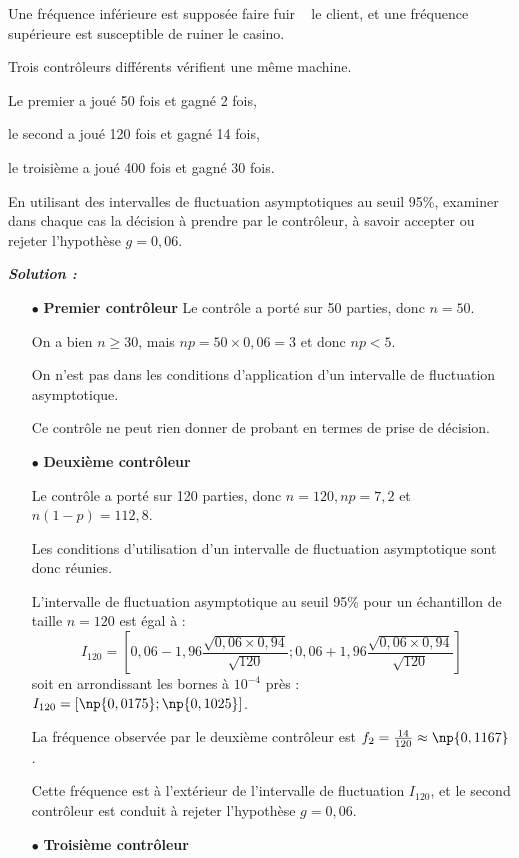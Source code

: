 \documentclass[12pt,french]{book}
\begin{document}
\begin{spacing}{1.2}
\begin{defi}
Une fréquence inférieure est supposée faire \og fuir \fg~ le client, et une fréquence supérieure est susceptible de ruiner le casino.

Trois contrôleurs différents vérifient une même machine.

Le premier a joué 50 fois et gagné 2 fois,

le second a joué 120 fois et gagné 14 fois,

le troisième a joué 400 fois et gagné 30 fois.

En utilisant des intervalles de fluctuation asymptotiques au seuil 95\%, examiner dans chaque cas la décision à prendre par le contrôleur, à savoir accepter ou rejeter l'hypothèse $g=0,06$.
\end{defi}

\bigskip

\textbf{\textit{Solution :}}

\begin{itemize}
\item[$\bullet$] \textbf{Premier contrôleur}
Le contrôle a porté sur 50 parties, donc $n=50$.

On a bien $n\geq 30$, mais $np=50\times 0,06=3$ et donc $np<5$.

On n'est pas dans les conditions d'application d'un intervalle de fluctuation asymptotique.

Ce contrôle ne peut rien donner de probant en termes de prise de décision.

\item[$\bullet$] \textbf{Deuxième contrôleur}

Le contrôle a porté sur 120 parties, donc $n=120, np=7,2$ et $n(1-p)=112,8$.

Les conditions d'utilisation d'un intervalle de fluctuation asymptotique sont donc réunies.

L'intervalle de fluctuation asymptotique au seuil 95\% pour un échantillon de taille $n=120$ est égal à :
\[I_{120}=\left[0,06-1,96\frac{\sqrt{0,06\times 0,94}}{\sqrt{120}};0,06+1,96\frac{\sqrt{0,06\times 0,94}}{\sqrt{120}}\right]\]
soit en arrondissant les bornes à $10^{-4}$ près : $I_{120}=[\np{0,0175};\np{0,1025}]$.

La fréquence observée par le deuxième contrôleur est $f_2=\frac{14}{120}\approx \np{0,1167}$.

Cette fréquence est à l'extérieur de l'intervalle de fluctuation $I_{120}$, et le second contrôleur est conduit à rejeter l'hypothèse $g=0,06$.

\item[$\bullet$] \textbf{Troisième contrôleur}


\end{itemize}
\end{spacing}
\end{document}

